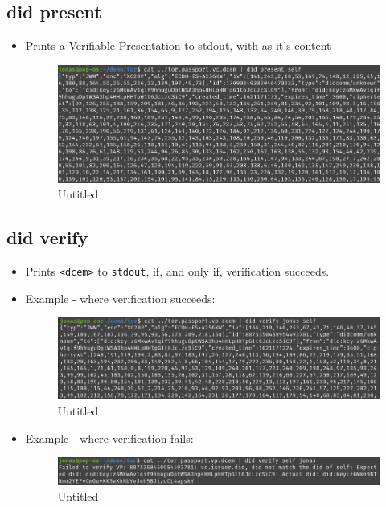 \hypertarget{did-present}{%
\subsection{\texorpdfstring{did present
}{did present  }}\label{did-present}}

\begin{itemize}
\item
  Prints a Verifiable Presentation to stdout, with as it's content

  \begin{figure}
  \centering
  \includegraphics{User Interface f8759a9462b24d5f95cf6123d68b89ea/Untitled 12.png}
  \caption{Untitled}
  \end{figure}
\end{itemize}

\hypertarget{did-verify}{%
\subsection{\texorpdfstring{did verify
}{did verify   }}\label{did-verify}}

\begin{itemize}
\item
  Prints \passthrough{\lstinline!<dcem>!} to
  \passthrough{\lstinline!stdout!}, if, and only if, verification
  succeeds.
\item
  Example - where verification succeeds:

  \begin{figure}
  \centering
  \includegraphics{User Interface f8759a9462b24d5f95cf6123d68b89ea/Untitled 13.png}
  \caption{Untitled}
  \end{figure}
\item
  Example - where verification fails:

  \begin{figure}
  \centering
  \includegraphics{User Interface f8759a9462b24d5f95cf6123d68b89ea/Untitled 14.png}
  \caption{Untitled}
  \end{figure}
\end{itemize}

